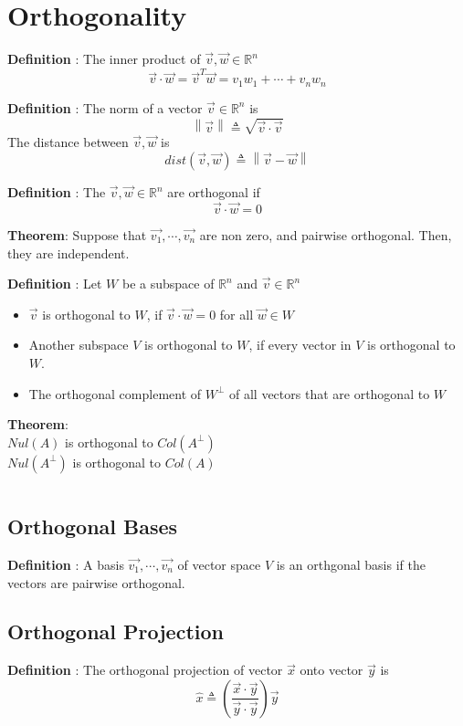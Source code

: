 \documentclass{article}
\newcommand{\norm}[1]{\left\lVert#1\right\rVert}
\begin{document}
\section{Orthogonality}
{


\textbf{Definition} : 
The inner product of $\vec{v},\vec{w} \in \mathbb{R}^{n}$
\[
\vec{v} \cdot \vec{w} = \vec{v}^T\vec{w} = v_1w_1 + \cdots + v_nw_n
\]

\textbf{Definition} : 
The norm of a vector $\vec{v}\in \mathbb{R}^{n}$ is
\[
\norm{\vec{v}} \triangleq \sqrt{\vec{v} \cdot \vec{v}}
\]
The distance between $\vec{v},\vec{w}$ is
\[
dist(\vec{v},\vec{w}) \triangleq \norm{\vec{v}-\vec{w}}
\]

\textbf{Definition} : 
The $\vec{v},\vec{w} \in \mathbb{R}^{n}$ are orthogonal if
\[
\vec{v} \cdot \vec{w} = 0
\]

\textbf{Theorem}:
Suppose that $\vec{v_1}, \cdots, \vec{v_n}$ are non zero, and pairwise orthogonal. Then, they are independent.
\[\]

\textbf{Definition} : 
Let $W$ be a subspace of  $\mathbb{R}^{n}$ and $\vec{v} \in \mathbb{R}^{n}$
\begin{itemize}
    \item $\vec{v}$ is orthogonal to $W$, if $\vec{v} \cdot \vec{w} = 0$ for all $\vec{w} \in W$
    \item Another subspace $V$ is orthogonal to $W$, if every vector in $V$ is orthogonal to $W$.
    \item The orthogonal complement of $W^\perp$ of all vectors that are orthogonal to $W$
\end{itemize}


\textbf{Theorem}:\\
$Nul(A)$ is orthogonal to $Col(A^\perp)$\\
$Nul(A^\perp)$ is orthogonal to $Col(A)$

\[\]

}


\subsection{Orthogonal Bases}
{
\textbf{Definition} : 
A basis $\vec{v_1}, \cdots , \vec{v_n}$ of vector space $V$ is an orthgonal basis if the vectors are pairwise orthogonal.

}


\subsection{Orthogonal Projection}
{
\textbf{Definition} : 
The orthogonal projection of vector $\vec{x}$ onto vector $\vec{y}$ is
\[
\hat{x} \triangleq (\frac{\vec{x} \cdot \vec{y}}{\vec{y} \cdot \vec{y}})\vec{y}
\]

}
\end{document}
